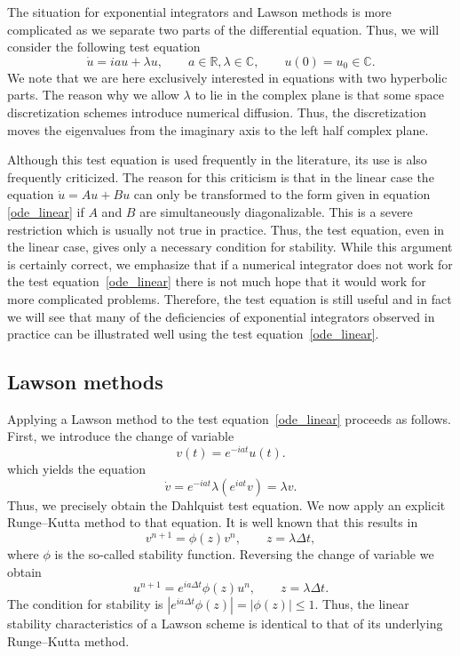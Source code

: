 The situation for exponential integrators and Lawson methods is more complicated as we separate two parts of the differential equation. Thus, we will consider the following test equation
\begin{equation}
\label{ode_linear}
\dot{u} = ia u + \lambda u, \qquad a\in\mathbb{R}, \lambda\in\mathbb{C}, \qquad u(0) = u_0\in\mathbb{C}.
\end{equation}
We note that we are here exclusively interested in equations with two hyperbolic parts. The reason why we allow $\lambda$ to lie in the complex plane is that some space discretization schemes introduce numerical diffusion. Thus, the discretization moves the eigenvalues from the imaginary axis to the left half complex plane.

Although this test equation is used frequently in the literature, its use is also frequently criticized. The reason for this criticism is that in the linear case the equation $\dot{u} = Au + Bu$ can only be transformed to the form given in equation \eqref{ode_linear} if $A$ and $B$ are simultaneously diagonalizable. This is a severe restriction which is usually not true in practice. Thus, the test equation, even in the linear case, gives only a necessary condition for stability. While this argument is certainly correct, we emphasize that if a numerical integrator does not work for the test equation~\eqref{ode_linear} there is not much hope that it would work for more complicated problems. Therefore, the test equation is still useful and in fact we will see that many of the deficiencies of exponential integrators observed in practice can be illustrated well using the test equation~\eqref{ode_linear}.


\subsection{Lawson methods}

Applying a Lawson method to the test equation~\eqref{ode_linear} proceeds as follows. First, we introduce the change of variable
\[ v(t)=e^{-iat} u(t). \]
which yields the equation
\[ \dot{v} = e^{-iat} \lambda (e^{iat }v) = \lambda v. \]
Thus, we precisely obtain the  Dahlquist test equation. We now apply an explicit Runge--Kutta method to that equation. It is well known that this results in
\[ v^{n+1} = \phi(z) v^n, \qquad z=\lambda \Delta t, \]
where $\phi$ is the so-called stability function. Reversing the change of variable we obtain
\[ u^{n+1} = e^{ia\Delta t} \phi(z) u^{n}, \qquad z=\lambda \Delta t. \]
The condition for stability is $| e^{ia\Delta t} \phi(z) | = | \phi(z) | \leq 1$. Thus, the linear stability characteristics of a Lawson scheme is identical to that of its underlying Runge--Kutta method. 

